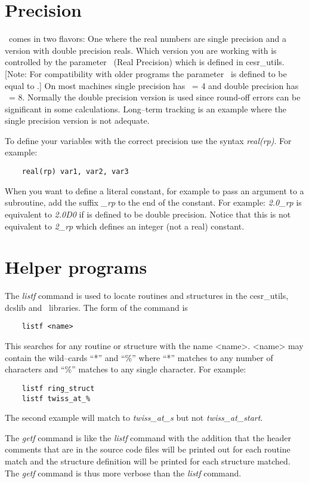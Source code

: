 \section{Precision}

\bmad\ comes in two flavors: One where the real numbers are single
precision and a version with double precision reals. Which version you
are working with is controlled by the parameter \rp\ (Real Precision)
which is defined in cesr\_utils. [Note: For compatibility with older
programs the parameter \rdef\ is defined to be equal to \rp.]  On most
machines single precision has \rp\ = 4 and double precision has \rp\ =
8. Normally the double precision version is used since round-off
errors can be significant in some calculations. Long--term tracking is
an example where the single precision version is not adequate. 

To define your variables with the correct precision use the syntax
{\it real(rp)}. For example:
\begin{verbatim}
    real(rp) var1, var2, var3
\end{verbatim}
When you want to define a literal constant, for example to pass an
argument to a subroutine, add the suffix {\it \_rp} to the end of the
constant. For example: {\it 2.0\_rp} is equivalent to {\it 2.0D0} if
\rp is defined to be double precision. Notice that this is not
equivalent to {\it 2\_rp} which defines an integer (not a real) constant.


\section{Helper programs}

The {\it listf} command is used to locate routines and structures in
the cesr\_utils, dcslib and \bmad\ libraries. The form of the command is
\begin{verbatim}
    listf <name>
\end{verbatim}
This searches for any routine or structure with the name
<name>. <name> may contain the wild--cards ``*'' and ``\%'' where
``*'' matches to any number of characters and ``\%'' matches to any
single character. For example:
\begin{verbatim}
    listf ring_struct
    listf twiss_at_%
\end{verbatim}
The second example will match to {\it twiss\_at\_s} but not {\sl
twiss\_at\_start}.

The {\it getf} command is like the {\it listf} command with the
addition that the header comments that are in the source code files
will be printed out for each routine match and the structure definition
will be printed for each structure matched. The {\it getf} command is
thus more verbose than the {\it listf} command.

